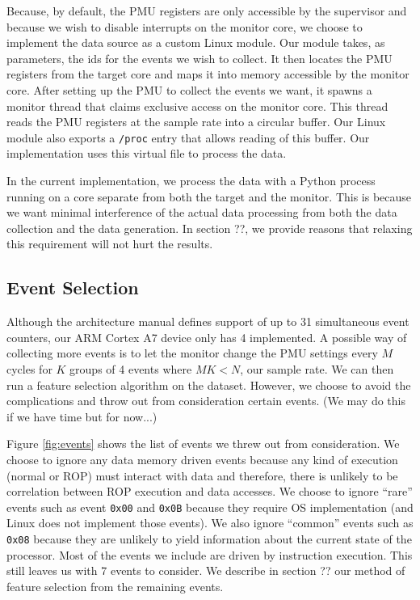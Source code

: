 \documentclass[letterpaper,twocolumn,10pt]{article}
\begin{document}
Because, by default, the PMU registers are only accessible by the supervisor and because 
we wish to disable interrupts on the monitor core, we choose to implement the data source as a 
custom Linux module. Our module takes, as parameters, the ids for the events we wish to collect. It then 
locates the PMU registers from the target core and maps it into memory accessible by the 
monitor core. After setting up the PMU to collect the events we want, it spawns a monitor 
thread that claims exclusive access on the monitor core. This thread reads the PMU registers 
at the sample rate into a circular buffer. Our Linux module also exports a \texttt{/proc} entry 
that allows reading of this buffer. Our implementation uses this virtual file to process the data.

In the current implementation, we process the data with a Python process running on a core 
separate from both the target and the monitor. This is because we want minimal interference 
of the actual data processing from both the data collection and the data generation. In 
section ??, we provide reasons that relaxing this requirement will not hurt the results.

\subsection*{Event Selection}

Although the architecture manual\cite{ARMv7} defines support of up to 31 simultaneous event 
counters, our ARM Cortex A7 device only has 4 implemented. A possible way of collecting 
more events is to let the monitor change the PMU settings every $M$ cycles for $K$ groups of 4 events where 
$M K < N$, our sample rate. We can then run a feature selection algorithm on the dataset. However, we choose to avoid the complications and 
throw out from consideration certain events. (We may do this if we have time but for now...)

Figure \ref{fig:events} shows the list of events we threw out from consideration. We choose to 
ignore any data memory driven events because any kind of execution (normal or ROP) must interact 
with data and therefore, there is unlikely to be correlation between ROP execution and data 
accesses. We choose to ignore ``rare'' events such as event \texttt{0x00} and \texttt{0x0B} 
because they require OS implementation (and Linux does not implement those events). We also 
ignore ``common'' events such as \texttt{0x08} because they are unlikely to yield information 
about the current state of the processor. Most of the events we include are driven by 
instruction execution. This still leaves us with 7 events to consider. We describe 
in section ?? our method of feature selection from the remaining events.
\end{document}
